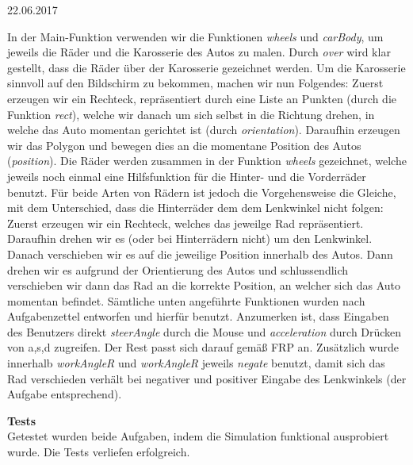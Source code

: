 \documentclass{rp}
\begin{document}


{22.06.2017} %

%
In der Main-Funktion verwenden wir die Funktionen \textit{wheels} und \textit{carBody}, um jeweils die Räder und die Karosserie des Autos zu malen. Durch \textit{over} wird klar gestellt, dass die Räder über der Karosserie gezeichnet werden. 
Um die Karosserie sinnvoll auf den Bildschirm zu bekommen, machen wir nun Folgendes: Zuerst erzeugen wir ein Rechteck, repräsentiert durch eine Liste an Punkten (durch die Funktion \textit{rect}), welche wir danach um sich selbst in die Richtung drehen, in welche das Auto momentan gerichtet ist (durch \textit{orientation}). Daraufhin erzeugen wir das Polygon und bewegen dies an die momentane Position des Autos (\textit{position}).
Die Räder werden zusammen in der Funktion \textit{wheels} gezeichnet, welche jeweils noch einmal eine Hilfsfunktion für die Hinter- und die Vorderräder benutzt. Für beide Arten von Rädern ist jedoch die Vorgehensweise die Gleiche, mit dem Unterschied, dass die Hinterräder dem dem Lenkwinkel nicht folgen: Zuerst erzeugen wir ein Rechteck, welches das jeweilge Rad repräsentiert. Daraufhin drehen wir es (oder bei Hinterrädern nicht) um den Lenkwinkel. Danach verschieben wir es auf die jeweilige Position innerhalb des Autos. Dann drehen wir es aufgrund der Orientierung des Autos und schlussendlich verschieben wir dann das Rad an die korrekte Position, an welcher sich das Auto momentan befindet.
Sämtliche unten angeführte Funktionen wurden nach Aufgabenzettel entworfen und hierfür benutzt. Anzumerken ist, dass Eingaben des Benutzers direkt \textit{steerAngle} durch die Mouse und \textit{acceleration} durch Drücken von a,s,d zugreifen. Der Rest passt sich darauf gemäß FRP an. Zusätzlich wurde innerhalb \textit{workAngleR} und \textit{workAngleR} jeweils \textit{negate} benutzt, damit sich das Rad verschieden verhält bei negativer und positiver Eingabe des Lenkwinkels (der Aufgabe entsprechend).

\textbf{Tests}\\
Getestet wurden beide Aufgaben, indem die Simulation funktional ausprobiert wurde. Die Tests verliefen erfolgreich.
\end{document}
